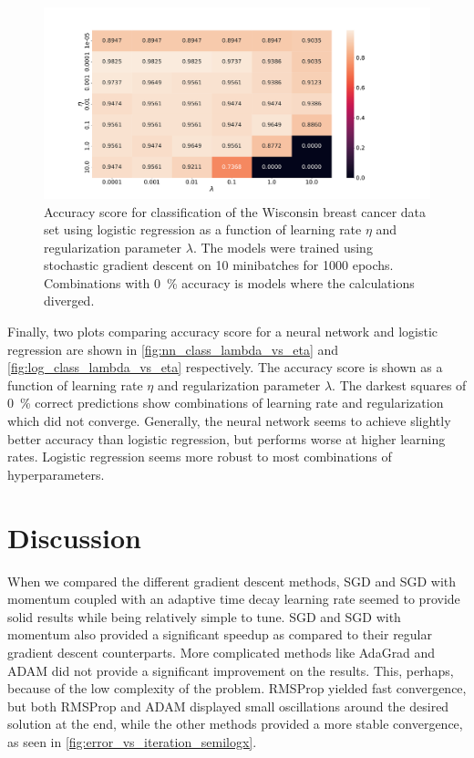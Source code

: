 \documentclass[12pt]{article}
\begin{document}
\begin{figure}
    \centering
    \includegraphics[width=0.91\linewidth]{images/logreg_regularization_vs_learning_rate_fixed_learning_1000_epochs.pdf}
    \caption{Accuracy score for classification of the Wisconsin breast cancer data set using logistic regression as a function of learning rate $\eta$ and regularization parameter $\lambda$. The models were trained using stochastic gradient descent on 10 minibatches for 1000 epochs. Combinations with \SI{0}{\%} accuracy is models where the calculations diverged.}
    \label{fig:log_class_lambda_vs_eta}
\end{figure}

Finally, two plots comparing accuracy score for a neural network and logistic regression are shown in \autoref{fig:nn_class_lambda_vs_eta} and \autoref{fig:log_class_lambda_vs_eta} respectively. The accuracy score is shown as a function of learning rate $\eta$ and regularization parameter $\lambda$. The darkest squares of \SI{0}{\%} correct predictions show combinations of learning rate and regularization which did not converge. Generally, the neural network seems to achieve slightly better accuracy than logistic regression, but performs worse at higher learning rates. Logistic regression seems more robust to most combinations of hyperparameters. 

\section{Discussion} \label{sec:discussion}
When we compared the different gradient descent methods, SGD and SGD with momentum coupled with an adaptive time decay learning rate seemed to provide solid results while being relatively simple to tune. SGD and SGD with momentum also provided a significant speedup as compared to their regular gradient descent counterparts. More complicated methods like AdaGrad and ADAM did not provide a significant improvement on the results. This, perhaps, because of the low complexity of the problem. RMSProp yielded fast convergence, but both RMSProp and ADAM displayed small oscillations around the desired solution at the end, while the other methods provided a more stable convergence, as seen in \autoref{fig:error_vs_iteration_semilogx}.
\end{document}
